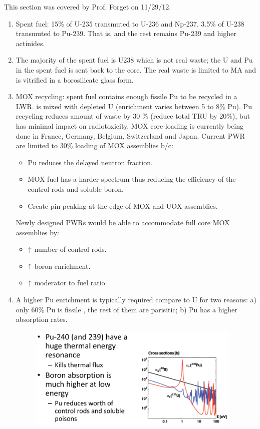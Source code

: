 \documentclass{school-22.211-notes}
\begin{document}
\clearpage
{}
This section was covered by Prof. Forget on 11/29/12. 
\begin{enumerate}
\item Spent fuel: 15\% of U-235 transmuted to U-236 and Np-237. 3.5\% of U-238 transmuted to Pu-239. That is,  and the rest remains Pu-239 and higher actinides. 

\item The majority of the spent fuel is U238 which is not real waste; the U and Pu in the spent fuel is sent back to the core. The real waste is limited to MA and is vitrified in a borosilicate glass form. 

\item MOX recycling: spent fuel contains enough fissile Pu to be recycled in a LWR.  is mixed with depleted U (enrichment varies between 5 to 8\% Pu). Pu recycling reduces amount of waste by 30 \% (reduce total TRU by 20\%), but has minimal impact on radiotoxicity. MOX core loading is currently being done in France, Germany, Belgium, Switzerland and Japan. Current PWR are limited to 30\% loading of MOX assemblies b/c: 
  \begin{itemize}
    \item Pu reduces the delayed neutron fraction. 
    \item MOX fuel has a harder spectrum thus reducing the efficiency of the control rods and soluble boron. 
    \item Create pin peaking at the edge of MOX and UOX assemblies. 
  \end{itemize}
  Newly designed PWRs would be able to accommodate full core MOX assemblies by: 
  \begin{itemize}
    \item $\uparrow$ number of control rods. 
    \item $\uparrow$ boron enrichment. 
    \item $\uparrow$ moderator to fuel ratio. 
  \end{itemize}

\item A higher Pu enrichment is typically required compare to U for two reasons: a) only 60\% Pu is fissile , the rest of them are parisitic; b) Pu has a higher absorption rates. 
  \begin{figure}[h]
    \centering
    \includegraphics[width=4in]{images/dfs/Pu-fuel.png}
  \end{figure}



\end{enumerate}
\end{document}
